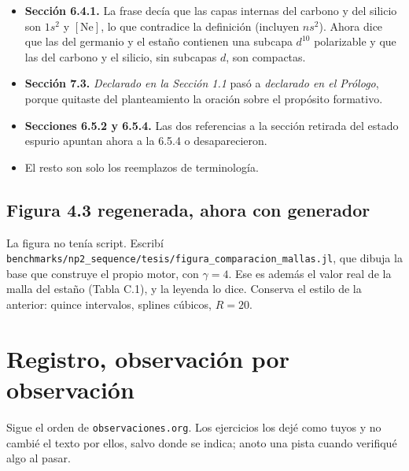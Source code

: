 \documentclass[11pt,a4paper]{article}
\newcommand{\arch}[1]{\texttt{\small #1}}
\begin{document}
\begin{itemize}
\item \textbf{Sección 6.4.1.} La frase decía que las capas internas del carbono y del silicio son
$1s^2$ y $[\mathrm{Ne}]$, lo que contradice la definición (incluyen $ns^2$). Ahora dice que las del
germanio y el estaño contienen una subcapa $d^{10}$ polarizable y que las del carbono y el silicio,
sin subcapas $d$, son compactas.
\item \textbf{Sección 7.3.} \emph{Declarado en la Sección 1.1} pasó a \emph{declarado en el
Prólogo}, porque quitaste del planteamiento la oración sobre el propósito formativo.
\item \textbf{Secciones 6.5.2 y 6.5.4.} Las dos referencias a la sección retirada del estado
espurio apuntan ahora a la 6.5.4 o desaparecieron.
\item El resto son solo los reemplazos de terminología.
\end{itemize}

\subsection{Figura 4.3 regenerada, ahora con generador}

La figura no tenía script. Escribí
\arch{benchmarks/np2\_sequence/tesis/figura\_comparacion\_mallas.jl}, que dibuja la base que
construye el propio motor, con $\gamma=4$. Ese es además el valor real de la malla del estaño
(Tabla C.1), y la leyenda lo dice. Conserva el estilo de la anterior: quince intervalos, splines
cúbicos, $R=20$.

\section{Registro, observación por observación}
\label{sec:registro}

Sigue el orden de \arch{observaciones.org}. Los ejercicios los dejé como tuyos y no cambié el texto por
ellos, salvo donde se indica; anoto una pista cuando verifiqué algo al pasar.
\end{document}
